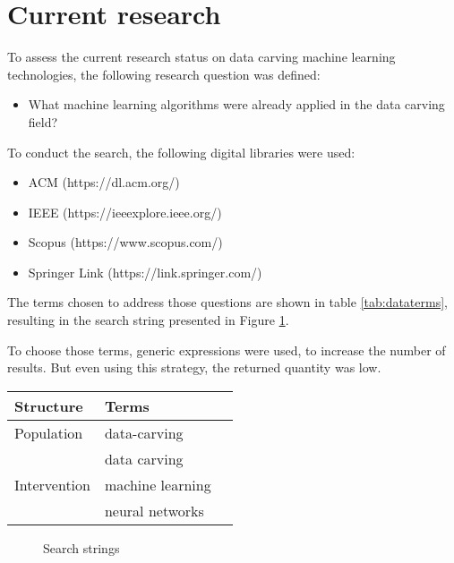 \section{Current research}
To assess the current research status on data carving machine learning technologies, the following research question was defined:

\begin{itemize}
    \item What machine learning algorithms were already applied in the data carving field?
\end{itemize}

To conduct the search, the following digital libraries were used: 
\begin{itemize}
\item{ACM} (https://dl.acm.org/)
\item IEEE (https://ieeexplore.ieee.org/)
\item Scopus (https://www.scopus.com/) 
\item Springer Link (https://link.springer.com/)
\end{itemize}



The terms chosen to address those questions are shown in table \ref{tab:dataterms}, resulting in the search string presented in  Figure \ref{fig:datasearchstring}.


To choose those terms, generic expressions were used, to increase the number of results. But even using this strategy, the returned quantity was low.


\begin{table*}[!ht]
    \centering
    \begin{tabular}{ l  l  l }
      Structure 	& Terms 		\\
      \hline\hline
      Population 	& data-carving \\   
                    & data carving \\
      \hline
      Intervention 	& machine learning \\
                    & neural networks \\
      \hline
    \end{tabular}
    \caption{Terms used}
    \label{tab:dataterms}
\end{table*}

\begin{figure}[!ht]
  \centering
  \caption{Search strings}
  \label{fig:datasearchstring}
\end{figure}


